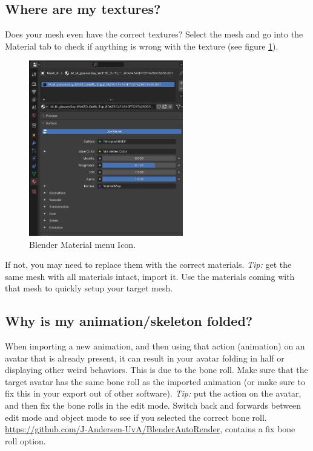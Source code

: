 \documentclass{uva-inf-article}
\begin{document}
\subsection{Where are my textures?}
Does your mesh even have the correct textures? Select the mesh and go into the Material tab to check if anything is wrong with the texture (see figure \ref{fig:texts}).
\begin{figure}[hbt!]
    \centering
    \includegraphics[width=0.6\textwidth]{imgs/material.png}
    \caption{Blender Material menu Icon.}
    \label{fig:texts}
\end{figure}

If not, you may need to replace them with the correct materials. \textit{Tip:} get the same mesh with all materials intact, import it. Use the materials coming with that mesh to quickly setup your target mesh.

\subsection{Why is my animation/skeleton folded?}
When importing a new animation, and then using that action (animation) on an avatar that is already present, it can result in your avatar folding in half or displaying other weird behaviors. This is due to the bone roll. Make sure that the target avatar has the same bone roll as the imported animation (or make sure to fix this in your export out of other software). \textit{Tip:} put the action on the avatar, and then fix the bone rolls in the edit mode. Switch back and forwards between edit mode and object mode to see if you selected the correct bone roll.
\url{https://github.com/J-Andersen-UvA/BlenderAutoRender}, contains a fix bone roll option.
\end{document}
